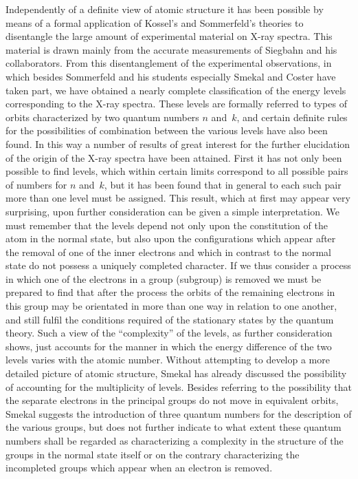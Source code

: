  Independently of a definite
view of atomic structure it has been possible by means of a formal
application of Kossel's and Sommerfeld's theories to disentangle
the large amount of experimental material on X-ray spectra. This
material is drawn mainly from the accurate measurements of
Siegbahn and his collaborators. From this disentanglement of the
experimental observations, in which besides Sommerfeld and his
students especially Smekal and Coster have taken part, we have
obtained a nearly complete classification of the energy levels corresponding
to the X-ray spectra. These levels are formally referred
to types of orbits characterized by two quantum numbers $n$ and~$k$,
and certain definite rules for the possibilities of combination
between the various levels have also been found. In this way a
number of results of great interest for the further elucidation of
the origin of the X-ray spectra have been attained. First it has
not only been possible to find levels, which within certain limits
correspond to all possible pairs of numbers for $n$ and~$k$, but it has
been found that in general to each such pair more than one level
must be assigned. This result, which at first may appear very
surprising, upon further consideration can be given a simple
interpretation. We must remember that the levels depend not
only upon the constitution of the atom in the normal state, but
also upon the configurations which appear after the removal
of one of the inner electrons and which in contrast to the normal
state do not possess a uniquely completed character. If we thus
consider a process in which one of the electrons in a group
(subgroup) is removed we must be prepared to find that after the
process the orbits of the remaining electrons in this group may be
orientated in more than one way in relation to one another, and
still fulfil the conditions required of the stationary states by the
quantum theory. Such a view of the ``complexity'' of the levels, as
further consideration shows, just accounts for the manner in which
the energy difference of the two levels varies with the atomic
number. Without attempting to develop a more detailed picture
of atomic structure, Smekal has already discussed the possibility
of accounting for the multiplicity of levels. Besides referring to
the possibility that the separate electrons in the principal groups
do not move in equivalent orbits, Smekal suggests the introduction
of three quantum numbers for the description of the various groups,
but does not further indicate to what extent these quantum
numbers shall be regarded as characterizing a complexity in the
structure of the groups in the normal state itself or on the
contrary characterizing the incompleted groups which appear
when an electron is removed.

